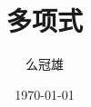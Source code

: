 \documentclass[twoside,a4paper]{article}
\title{多项式}
\author{么冠雄}
\date{\today}
\begin{document}
\maketitle
\begin{abstract}
\end{abstract}
\end{document}
